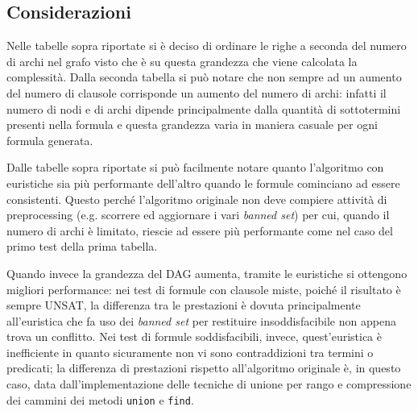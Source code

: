 \documentclass[a4paper,11pt]{article}
\begin{document}
\subsection{Considerazioni}
Nelle tabelle sopra riportate si è deciso di ordinare le righe a 
seconda del numero di archi nel grafo visto che è su questa grandezza 
che viene calcolata la complessità. Dalla seconda tabella si può 
notare che non sempre ad un aumento del numero di clausole corrisponde 
un aumento del numero di archi: infatti il numero di nodi e di archi 
dipende principalmente dalla quantità di sottotermini presenti nella formula 
e questa grandezza varia in maniera casuale per ogni formula generata.\par
Dalle tabelle sopra riportate si può facilmente notare quanto 
l'algoritmo con euristiche sia più performante dell'altro quando le 
formule cominciano ad essere consistenti. Questo perché l'algoritmo originale 
non deve compiere attività di preprocessing (e.g. scorrere ed 
aggiornare i vari \emph{banned set}) per cui, quando il numero di archi 
è limitato, riescie ad essere più performante come nel caso del primo 
test della prima tabella. \par 
Quando invece la grandezza del DAG aumenta, tramite le euristiche si 
ottengono migliori performance: nei test di formule con clausole miste, 
poiché il risultato è sempre UNSAT, la differenza tra le prestazioni è 
dovuta principalmente all'euristica che fa uso dei \emph{banned set} 
per restituire insoddisfacibile non appena trova un conflitto. 
Nei test di formule soddisfacibili, invece, quest'euristica è 
inefficiente in quanto sicuramente non vi sono contraddizioni tra 
termini o predicati; la differenza di prestazioni rispetto all'algoritmo 
originale è, in questo caso, data dall'implementazione delle tecniche 
di unione per rango e compressione dei cammini dei metodi \texttt{union} 
e \texttt{find}.
\end{document}
